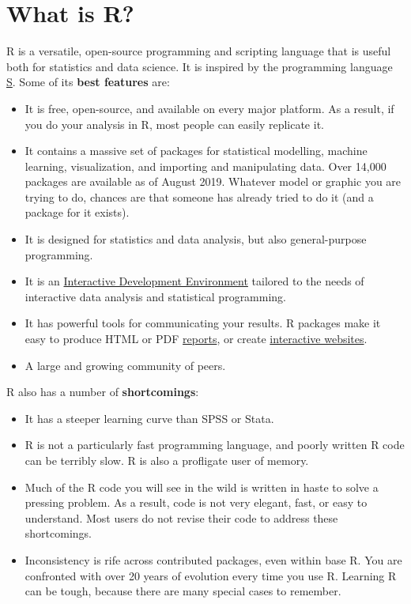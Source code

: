 \documentclass[
]{book}
\begin{document}
\hypertarget{what-is-r}{%
\section{What is R?}\label{what-is-r}}

R is a versatile, open-source programming and scripting language that is useful both for statistics and data science. It is inspired by the programming language \href{https://en.wikipedia.org/wiki/S_(programming_language)}{S}. Some of its \textbf{best features} are:

\begin{itemize}
\item
  It is free, open-source, and available on every major platform. As a result, if you do your analysis in R, most people can easily replicate it.
\item
  It contains a massive set of packages for statistical modelling, machine learning, visualization, and importing and manipulating data. Over 14,000 packages are available as of August 2019. Whatever model or graphic you are trying to do, chances are that someone has already tried to do it (and a package for it exists).
\item
  It is designed for statistics and data analysis, but also general-purpose programming.
\item
  It is an \href{http://www.rstudio.com/ide/}{Interactive Development Environment} tailored to the needs of interactive data analysis and statistical programming.
\item
  It has powerful tools for communicating your results. R packages make it easy to produce HTML or PDF \href{http://yihui.name/knitr/}{reports}, or create \href{http://www.rstudio.com/shiny/}{interactive websites}.
\item
  A large and growing community of peers.
\end{itemize}

R also has a number of \textbf{shortcomings}:

\begin{itemize}
\item
  It has a steeper learning curve than SPSS or Stata.
\item
  R is not a particularly fast programming language, and poorly written R code can be terribly slow. R is also a profligate user of memory.
\item
  Much of the R code you will see in the wild is written in haste to solve a pressing problem. As a result, code is not very elegant, fast, or easy to understand. Most users do not revise their code to address these shortcomings.
\item
  Inconsistency is rife across contributed packages, even within base R. You are confronted with over 20 years of evolution every time you use R. Learning R can be tough, because there are many special cases to remember.
\end{itemize}
\end{document}

